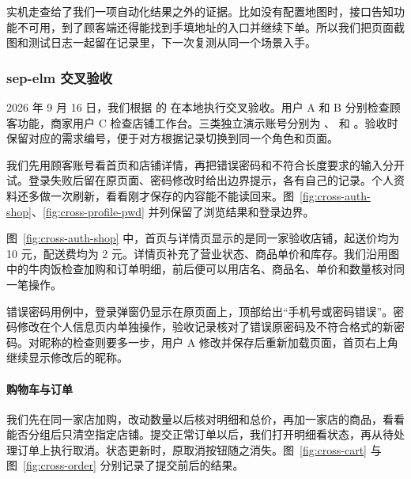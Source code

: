 实机走查给了我们一项自动化结果之外的证据。比如没有配置地图时，接口告知功能不可用，到了顾客端还得能找到手填地址的入口并继续下单。所以我们把页面截图和测试日志一起留在记录里，下一次复测从同一个场景入手。

\clearpage
\subsubsection{sep-elm 交叉验收}\label{app:cross-checks}

2026 年 9 月 16 日，我们根据  的  在本地执行交叉验收。用户 A 和 B 分别检查顾客功能，商家用户 C 检查店铺工作台。三类独立演示账号分别为 、 和 。验收时保留对应的需求编号，便于对方根据记录切换到同一个角色和页面。

我们先用顾客账号看首页和店铺详情，再把错误密码和不符合长度要求的输入分开试。登录失败后留在原页面、密码修改时给出边界提示，各有自己的记录。个人资料还多做一次刷新，看看刚才保存的内容能不能读回来。图~\ref{fig:cross-auth-shop}、\ref{fig:cross-profile-pwd} 并列保留了浏览结果和登录边界。

图~\ref{fig:cross-auth-shop} 中，首页与详情页显示的是同一家验收店铺，起送价均为 10 元，配送费均为 2 元。详情页补充了营业状态、商品单价和库存。我们沿用图中的牛肉饭检查加购和订单明细，前后便可以用店名、商品名、单价和数量核对同一笔操作。


错误密码用例中，登录弹窗仍显示在原页面上，顶部给出“手机号或密码错误”。密码修改在个人信息页内单独操作，验收记录核对了错误原密码及不符合格式的新密码。对昵称的检查则要多一步，用户 A 修改并保存后重新加载页面，首页右上角继续显示修改后的昵称。


\clearpage
\paragraph{购物车与订单}
我们先在同一家店加购，改动数量以后核对明细和总价，再加一家店的商品，看看能否分组后只清空指定店铺。提交正常订单以后，我们打开明细看状态，再从待处理订单上执行取消。状态更新时，原取消按钮随之消失。图~\ref{fig:cross-cart} 与图~\ref{fig:cross-order} 分别记录了提交前后的结果。

